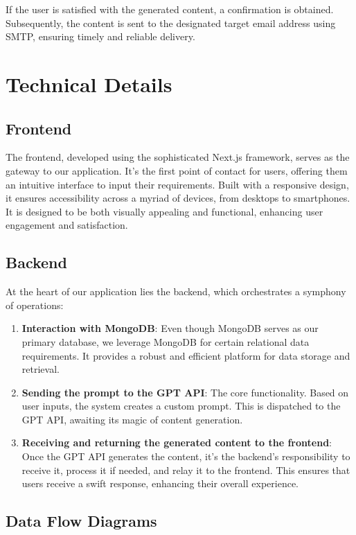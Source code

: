 If the user is satisfied with the generated content, a confirmation is obtained. Subsequently, the content is sent to the designated target email address using SMTP, ensuring timely and reliable delivery.

\section{Technical Details}

\subsection{Frontend}
The frontend, developed using the sophisticated Next.js framework, serves as the gateway to our application. It's the first point of contact for users, offering them an intuitive interface to input their requirements. Built with a responsive design, it ensures accessibility across a myriad of devices, from desktops to smartphones. It is designed to be both visually appealing and functional, enhancing user engagement and satisfaction.

\subsection{Backend}
At the heart of our application lies the backend, which orchestrates a symphony of operations:

\begin{enumerate}
	\item \textbf{Interaction with MongoDB}: Even though MongoDB serves as our primary database, we leverage MongoDB for certain relational data requirements. It provides a robust and efficient platform for data storage and retrieval.
	      	          
	\item \textbf{Sending the prompt to the GPT API}: The core functionality. Based on user inputs, the system creates a custom prompt. This is dispatched to the GPT API, awaiting its magic of content generation.
	      	          
	\item \textbf{Receiving and returning the generated content to the frontend}: Once the GPT API generates the content, it's the backend's responsibility to receive it, process it if needed, and relay it to the frontend. This ensures that users receive a swift response, enhancing their overall experience.
\end{enumerate}

\subsection{Data Flow Diagrams}

